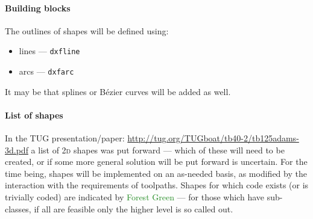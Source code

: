 \documentclass{ltxdoc}
\begin{document}
\paragraph{Building blocks}

The outlines of shapes will be defined using:

\begin{itemize}
\item lines --- \verb|dxfline|
\item arcs --- \verb|dxfarc|
\end{itemize}

It may be that splines or Bézier curves will be added as well.

\paragraph{List of shapes}

In the TUG presentation/paper: \url{http://tug.org/TUGboat/tb40-2/tb125adams-3d.pdf} a list of \textsc{2d} shapes was put forward --- which of these will need to be created, or if some more general solution will be put forward is uncertain. For the time being, shapes will be implemented on an as-needed basis, as modified by the interaction with the requirements of toolpaths. Shapes for which code exists (or is trivially coded) are indicated by \textcolor{ForestGreen}{Forest Green} --- for those which have sub-classes, if all are feasible only the higher level is so called out.
\end{document}
